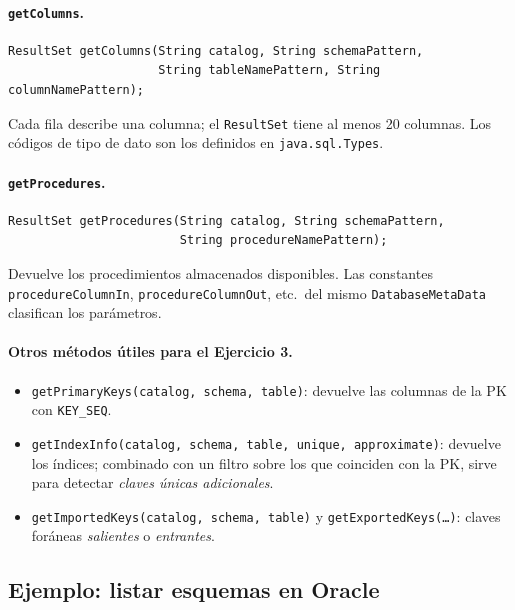 \documentclass[11pt,a4paper]{article}
\begin{document}
\paragraph{\texttt{getColumns}.}

\begin{lstlisting}
ResultSet getColumns(String catalog, String schemaPattern,
                     String tableNamePattern, String columnNamePattern);
\end{lstlisting}

Cada fila describe una columna; el \texttt{ResultSet} tiene al menos
20 columnas. Los códigos de tipo de dato son los definidos en
\texttt{java.sql.Types}.

\paragraph{\texttt{getProcedures}.}

\begin{lstlisting}
ResultSet getProcedures(String catalog, String schemaPattern,
                        String procedureNamePattern);
\end{lstlisting}

Devuelve los procedimientos almacenados disponibles. Las constantes
\texttt{procedureColumnIn}, \texttt{procedureColumnOut}, etc.\ del
mismo \texttt{DatabaseMetaData} clasifican los parámetros.

\paragraph{Otros métodos útiles para el Ejercicio 3.}

\begin{itemize}
    \item \texttt{getPrimaryKeys(catalog, schema, table)}: devuelve
    las columnas de la PK con \texttt{KEY\_SEQ}.
    \item \texttt{getIndexInfo(catalog, schema, table, unique,
    approximate)}: devuelve los índices; combinado con un filtro
    sobre los que coinciden con la PK, sirve para detectar
    \emph{claves únicas adicionales}.
    \item \texttt{getImportedKeys(catalog, schema, table)} y
    \texttt{getExportedKeys(\dots)}: claves foráneas \emph{salientes}
    o \emph{entrantes}.
\end{itemize}

\subsection*{Ejemplo: listar esquemas en Oracle}
\end{document}
